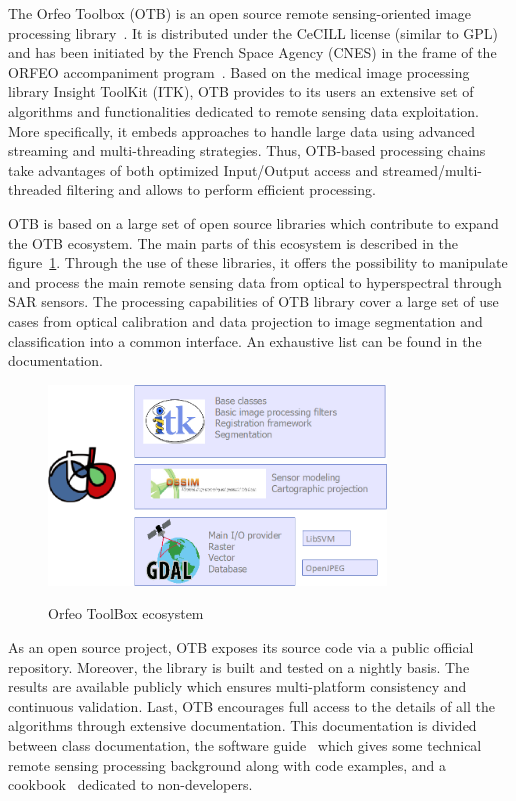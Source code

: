 \documentclass{josis}
\begin{document}
The Orfeo Toolbox (OTB) is an open source remote sensing-oriented
image processing library~\cite{inglada2009orfeo}. It is distributed
under the CeCILL license (similar to GPL) and has been initiated by
the French Space Agency (CNES) in the frame of the ORFEO accompaniment
program~\cite{tinel2012orfeo}. Based on the medical image processing
library Insight ToolKit (ITK), OTB provides to its users an extensive
set of algorithms and functionalities dedicated to remote sensing data
exploitation. More specifically, it embeds approaches to handle large
data using advanced streaming and multi-threading strategies. Thus,
OTB-based processing chains take advantages of both optimized
Input/Output access and streamed/multi-threaded filtering and allows
to perform efficient processing.

OTB is based on a large set of open source libraries which contribute to expand
the OTB ecosystem. The main parts of this ecosystem is described in the
figure~\ref{fig:ecosystem}. Through the use of these libraries, it offers the
possibility to manipulate and process the main remote sensing data from optical
to hyperspectral through SAR sensors. The processing capabilities of OTB library
cover a large set of use cases from optical calibration and data projection to
image segmentation and classification into a common interface. An exhaustive
list can be found in the documentation.

\begin{figure}[!htb]
\centering
\includegraphics[width=0.8\textwidth]{Pictures/otb_ecosystem}\label{fig:ecosystem}
\caption{Orfeo ToolBox ecosystem}
\end{figure}

As an open source project, OTB exposes its source code via a public
official repository. Moreover, the library is built and tested on a
nightly basis. The results are available publicly which ensures
multi-platform consistency and continuous validation. Last, OTB
encourages full access to the details of all the algorithms through
extensive documentation. This documentation is divided between class
documentation, the software guide~\cite{otbSoftwareGuide} which gives
some technical remote sensing processing background along with code
examples, and a cookbook~\cite{otbCookBook} dedicated to non-developers.
\end{document}
